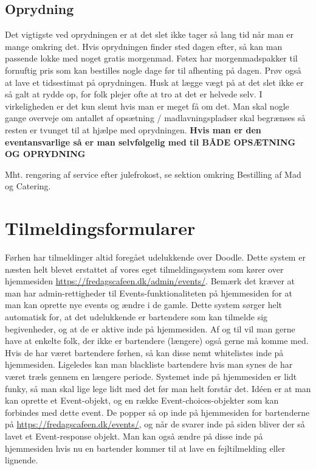 \subsection*{Oprydning}
\label{sec:oprydning}

Det vigtigste ved oprydningen er at det slet ikke tager så lang tid når man er mange omkring det. Hvis oprydningen finder sted dagen efter, så kan man passende lokke med noget gratis morgenmad. Føtex har morgenmadspakker til fornuftig pris som kan bestilles nogle dage før til afhenting på dagen. Prøv også at lave et tidsestimat på oprydningen. Husk at lægge vægt på at det slet ikke er så galt at rydde op, for folk plejer ofte at tro at det er helvede selv. I virkeligheden er det kun slemt hvis man er meget få om det. Man skal nogle gange overveje om antallet af opsætning / madlavningspladser skal begrænses så resten er tvunget til at hjælpe med oprydningen. \textbf{Hvis man er den eventansvarlige så er man selvfølgelig med til BÅDE OPSÆTNING OG OPRYDNING}

Mht. rengøring af service efter julefrokost, se sektion omkring Bestilling af Mad og Catering.

\section*{Tilmeldingsformularer}
\label{sec:tilmelding}

Førhen har tilmeldinger altid foregået udelukkende over Doodle. Dette system er næsten helt blevet erstattet af vores eget tilmeldingssystem som kører over hjemmesiden \url{https://fredagscafeen.dk/admin/events/}. Bemærk det kræver at man har admin-rettigheder til Events-funktionaliteten på hjemmesiden for at man kan oprette nye events og ændre i de gamle. Dette system sørger helt automatisk for, at det udelukkende er bartendere som kan tilmelde sig begivenheder, og at de er aktive inde på hjemmesiden. Af og til vil man gerne have at enkelte folk, der ikke er bartendere (længere) også gerne må komme med. Hvis de har været bartendere førhen, så kan disse nemt whitelistes inde på hjemmesiden. Ligeledes kan man blackliste bartendere hvis man synes de har været træls gennem en længere periode. Systemet inde på hjemmesiden er lidt funky, så man skal lige lege lidt med det før man helt forstår det. Idéen er at man kan oprette et Event-objekt, og en række Event-choices-objekter som kan forbindes med dette event. De popper så op inde på hjemmesiden for bartenderne på \url{https://fredagscafeen.dk/events/}, og når de svarer inde på siden bliver der så lavet et Event-response objekt. Man kan også ændre på disse inde på hjemmesiden hvis nu en bartender kommer til at lave en fejltilmelding eller lignende.

